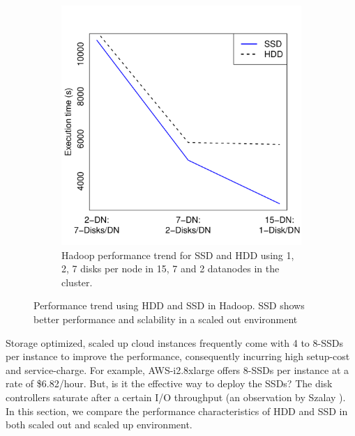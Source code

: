\documentclass[10pt, conference, compsocconf]{IEEEtran}
\begin{document}
\begin{figure}[h]
\begin{subfigure}[b]{0.23\textwidth}
          \includegraphics[width=\textwidth]{Figure/PerormanceData/Plots/SSDHDDDiffNode.pdf}
          \caption{Hadoop performance trend for SSD and HDD using 1, 2, 7 disks per node in 15, 7 and 2 datanodes in the cluster.}
          \label{fig:SsdNHddDiffNodes}
  \end{subfigure}
  \caption{Performance trend using HDD and SSD in Hadoop. SSD shows better performance and sclability in a scaled out environment}
  \label{fig:SsdNHdd}
  \vspace{-.8em}
\end{figure}
Storage optimized, scaled up cloud instances frequently come with 4 to 8-SSDs per instance to improve the performance, consequently incurring high setup-cost and service-charge. For example, AWS-i2.8xlarge offers 8-SSDs per instance at a rate of \$6.82/hour. But, is it the effective way to deploy the SSDs? The disk controllers saturate after a certain I/O throughput (an observation by Szalay \cite{cluster:AmdahlBalancedBlade}). In this section, we compare the performance characteristics of HDD and SSD in both scaled out and scaled up environment.
\end{document}
